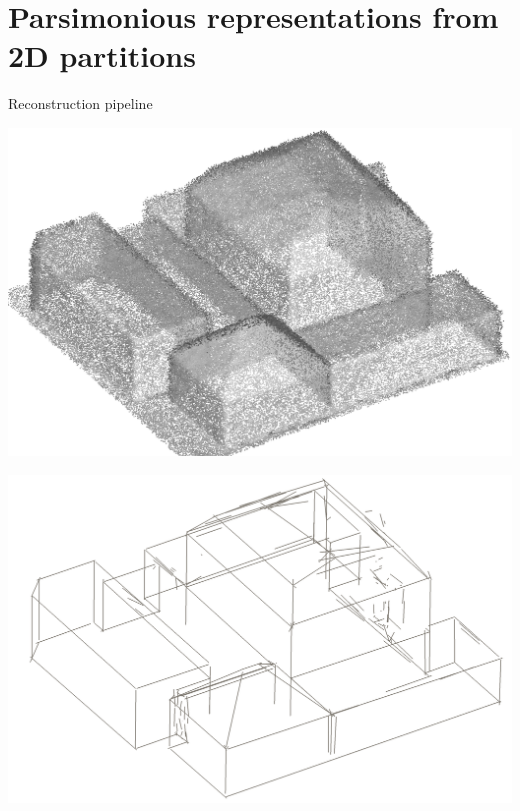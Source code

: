 \graphicspath{{images/arrangements/}}

\section{Parsimonious representations from 2D partitions}

%	
	
\begin{frame}{Reconstruction pipeline}
	\begin{minipage}[b]{0.2\linewidth}
	\includegraphics[width=\linewidth]{pipeline/pointcloud_crop}
	\end{minipage}%
	\begin{minipage}[b]{0.2\linewidth}
		\includegraphics[width=\linewidth]{pipeline/segments_crop}
	\end{minipage}%

\end{frame}
